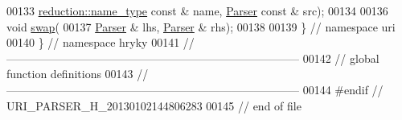 \begin{DoxyCode}
00133         \hyperlink{classhryky_1_1reduction_1_1_string}{reduction::name_type} \textcolor{keyword}{const} & name, \hyperlink{classhryky_1_1uri_1_1_parser}{Parser} \textcolor{keyword}{const} & src);
00134 
00136     \textcolor{keywordtype}{void} \hyperlink{namespacehryky_1_1uri_a385681623309ce37d502b7efea1bf924}{swap}(
00137         \hyperlink{classhryky_1_1uri_1_1_parser}{Parser} & lhs, \hyperlink{classhryky_1_1uri_1_1_parser}{Parser} & rhs);
00138 
00139 \} \textcolor{comment}{// namespace uri}
00140 \} \textcolor{comment}{// namespace hryky}
00141 \textcolor{comment}{//
      ------------------------------------------------------------------------------}
00142 \textcolor{comment}{// global function definitions}
00143 \textcolor{comment}{//
      ------------------------------------------------------------------------------}
00144 \textcolor{preprocessor}{#endif // URI\_PARSER\_H\_20130102144806283}
00145 \textcolor{preprocessor}{}\textcolor{comment}{// end of file}
\end{DoxyCode}
